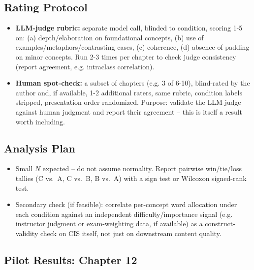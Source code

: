 \subsection{Rating Protocol}
\begin{itemize}
    \item \textbf{LLM-judge rubric:} separate model call, blinded to condition,
          scoring 1-5 on: (a) depth/elaboration on foundational concepts,
          (b) use of examples/metaphors/contrasting cases, (c) coherence,
          (d) absence of padding on minor concepts. Run 2-3 times per chapter to
          check judge consistency (report agreement, e.g. intraclass correlation).
    \item \textbf{Human spot-check:} a subset of chapters (e.g. 3 of 6-10),
          blind-rated by the author and, if available, 1-2 additional raters, same
          rubric, condition labels stripped, presentation order randomized.
          Purpose: validate the LLM-judge against human judgment and report their
          agreement -- this is itself a result worth including.
\end{itemize}

\subsection{Analysis Plan}
\begin{itemize}
    \item Small $N$ expected -- do not assume normality. Report pairwise win/tie/loss
          tallies (C vs.\ A, C vs.\ B, B vs.\ A) with a sign test or Wilcoxon
          signed-rank test.
    \item Secondary check (if feasible): correlate per-concept word allocation
          under each condition against an independent difficulty/importance
          signal (e.g. instructor judgment or exam-weighting data, if available)
          as a construct-validity check on CIS itself, not just on downstream
          content quality.
\end{itemize}

\subsection{Pilot Results: Chapter 12}
\label{sec:pilot-ch12}


